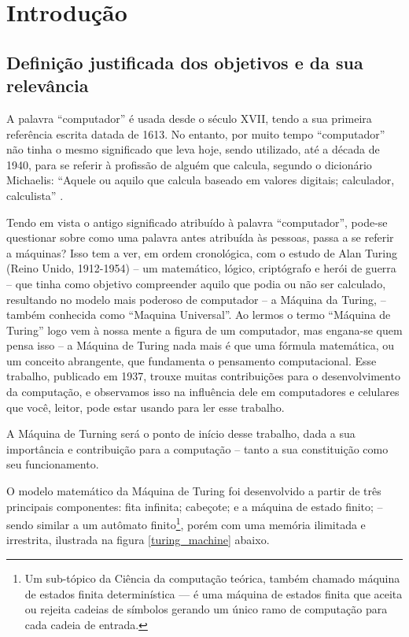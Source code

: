 \section{Introdução} 
\subsection{Definição justificada dos objetivos e da sua relevância}
A palavra ``computador'' é usada desde o século XVII, tendo a sua primeira referência escrita datada de 1613. No entanto, por muito tempo ``computador'' não tinha o mesmo significado que leva hoje, sendo utilizado, até a década de 1940, para se referir à profissão de alguém que calcula, segundo o dicionário Michaelis: ``Aquele ou aquilo que calcula baseado em valores digitais; calculador, calculista'' \cite{4}.

Tendo em vista o antigo significado atribuído à palavra ``computador'', pode-se questionar sobre como uma palavra antes atribuída às pessoas, passa a se referir a máquinas? Isso tem a ver, em ordem cronológica, com o estudo de Alan Turing (Reino Unido, 1912-1954) – um matemático, lógico, criptógrafo e herói de guerra – que tinha como objetivo compreender aquilo que podia ou não ser calculado, resultando no modelo mais poderoso de computador – a Máquina da Turing, – também conhecida como ``Maquina Universal''. Ao lermos o termo ``Máquina de Turing'' logo vem à nossa mente a figura de um computador, mas engana-se quem pensa isso – a Máquina de Turing nada mais é que uma fórmula matemática, ou um conceito abrangente, que fundamenta o pensamento computacional. Esse trabalho, publicado em 1937, trouxe muitas contribuições para o desenvolvimento da computação, e observamos isso na influência dele em computadores e celulares que você, leitor, pode estar usando para ler esse  trabalho.  

A Máquina de Turning será o ponto de início desse trabalho, dada a sua importância e contribuição para a computação – tanto a sua constituição como seu funcionamento. 

O modelo matemático da Máquina de Turing foi desenvolvido a partir de três principais componentes: fita infinita; cabeçote; e a máquina de estado finito; – sendo similar a um autômato finito\footnote{Um sub-tópico da Ciência da computação teórica, também chamado máquina de estados finita determinística — é uma máquina de estados finita que aceita ou rejeita cadeias de símbolos gerando um único ramo de computação para cada cadeia de entrada.}, porém com uma memória ilimitada e irrestrita, ilustrada na figura \ref{turing_machine} abaixo.

